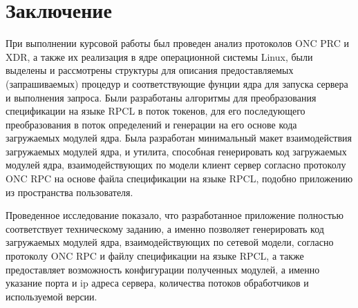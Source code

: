 \section*{Заключение}

При выполнении курсовой работы был проведен анализ протоколов ONC PRC и XDR, а
также их реализация в ядре операционной системы Linux, были выделены и
рассмотрены структуры для описания предоставляемых (запрашиваемых) процедур и
соответствующие фунции ядра для запуска сервера и выполнения запроса. Были
разработаны алгоритмы для преобразования спецификации на языке RPCL в поток
токенов, для его последующего преобразования в поток определений и генерации на
его основе кода загружаемых модулей ядра. Была разработан минимальный макет
взаимодействия загружаемых модулей ядра, и утилита, способная генерировать код
загружаемых модулей ядра, взаимодействующих по модели клиент сервер согласно
протоколу ONC RPC на основе файла спецификации на языке RPCL, подобно
приложению  из пространства пользователя.

Проведенное исследование показало, что разработанное приложение полностью
соответствует техническому заданию, а именно позволяет генерировать код
загружаемых модулей ядра, взаимодействующих по сетевой модели, согласно
протоколу ONC RPC и файлу спецификации на языке RPCL, а также предоставляет
возможность конфигурации полученных модулей, а именно указание порта и ip
адреса сервера, количества потоков обработчиков и используемой версии.

